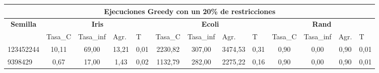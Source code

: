 \documentclass[12pt, spanish]{article}
\begin{document}
\begin{table}[H]
\small

\begin{adjustwidth}{-1cm}{-1cm}%

\begin{tabular}{|l|c|c|c|c|c|c|c|c|c|c|c|c|}
\hline
\multicolumn{13}{|c|}{\textbf{Ejecuciones Greedy con un 20\% de restricciones}}                                                                                                                                                                                                                                                                                                                                        \\ \hline
\multicolumn{1}{|c|}{\multirow{2}{*}{\textbf{Semilla}}} & \multicolumn{4}{c|}{\textbf{Iris}}                                                                                 & \multicolumn{4}{c|}{\textbf{Ecoli}}                                                                                & \multicolumn{4}{c|}{\textbf{Rand}}                                                                                 \\ \cline{2-13} 
\multicolumn{1}{|c|}{}                                  & \multicolumn{1}{l|}{Tasa\_C} & \multicolumn{1}{l|}{Tasa\_inf} & \multicolumn{1}{l|}{Agr.} & \multicolumn{1}{l|}{T} & \multicolumn{1}{l|}{Tasa\_C} & \multicolumn{1}{l|}{Tasa\_inf} & \multicolumn{1}{l|}{Agr.} & \multicolumn{1}{l|}{T} & \multicolumn{1}{l|}{Tasa\_C} & \multicolumn{1}{l|}{Tasa\_inf} & \multicolumn{1}{l|}{Agr.} & \multicolumn{1}{l|}{T} \\ \hline
123452244                                               & 10,11                        & 69,00                          & 13,21                     & 0,01                   & 2230,82                      & 307,00                         & 3474,53                   & 0,31                   & 0,90                         & 0,00                           & 0,90                      & 0,01                   \\ \hline
9398429                                                 & 0,67                         & 17,00                          & 1,43                      & 0,02                   & 1132,79                      & 282,00                         & 2275,22                   & 0,16                   & 0,90                         & 0,00                           & 0,90                      & 0,01                   \\ \hline

\end{tabular}
\end{adjustwidth}
\end{table}
\end{document}
